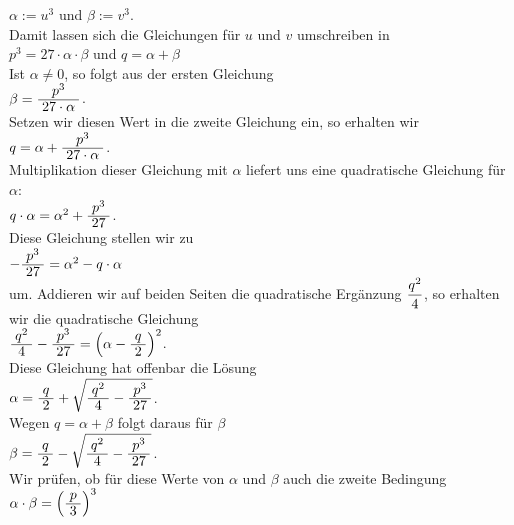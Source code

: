 \hspace*{1.3cm}
$\alpha := u^3$ \quad und \quad $\beta := v^3$.
\\[0.2cm]
Damit lassen sich die Gleichungen für $u$ und $v$ umschreiben in
\\[0.2cm]
\hspace*{1.3cm}
$p^3 = 27 \cdot \alpha \cdot \beta$ \quad und \quad $q = \alpha + \beta$
\\[0.2cm]
Ist $\alpha \not= 0$, so folgt aus der ersten Gleichung
\\[0.2cm]
\hspace*{1.3cm}
$\beta = \bruch{p^3}{27 \cdot \alpha}$.
\\[0.2cm]
Setzen wir diesen Wert in die zweite Gleichung ein, so erhalten wir
\\[0.2cm]
\hspace*{1.3cm}
$q = \alpha + \bruch{p^3}{27 \cdot \alpha}$.
\\[0.2cm]
Multiplikation dieser Gleichung mit $\alpha$ liefert uns eine quadratische Gleichung für $\alpha$:
\\[0.2cm]
\hspace*{1.3cm}
$q \cdot \alpha = \alpha^2 + \bruch{p^3}{27}$.
\\[0.2cm]
Diese Gleichung stellen wir zu 
\\[0.2cm]
\hspace*{1.3cm}
$- \bruch{p^3}{27} = \alpha^2 - q \cdot \alpha$
\\[0.2cm]
um.  Addieren wir auf beiden Seiten die quadratische Ergänzung $\displaystyle\frac{q^2}{4}$, so erhalten wir
die quadratische Gleichung
\\[0.2cm]
\hspace*{1.3cm}
$\bruch{q^2}{4} - \bruch{p^3}{27} = \left(\alpha - \bruch{q}{2}\right)^2$.
\\[0.2cm]
Diese Gleichung hat offenbar die Lösung
\\[0.2cm]
\hspace*{1.3cm}
$\alpha = \bruch{q}{2} + \sqrt{\bruch{q^2}{4} - \bruch{p^3}{27}}$.
\\[0.2cm]
Wegen $q = \alpha + \beta$ folgt daraus für $\beta$
\\[0.2cm]
\hspace*{1.3cm}
$\beta = \bruch{q}{2} - \sqrt{\bruch{q^2}{4} - \bruch{p^3}{27}}$.
\\[0.2cm]
Wir prüfen, ob für diese Werte von $\alpha$ und $\beta$ auch die zweite Bedingung 
\\[0.2cm]
\hspace*{1.3cm}
$\alpha \cdot \beta = \Bigl(\bruch{p}{3}\Bigr)^3$
